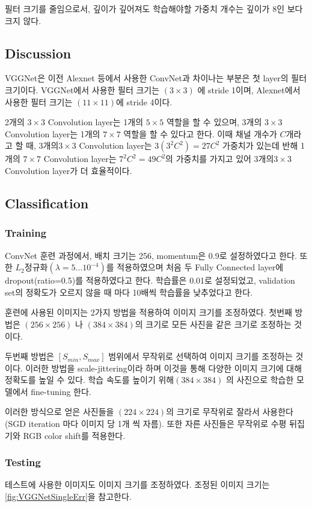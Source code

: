 \documentclass[extendedabs]{bmvc2k}
\begin{document}
필터 크기를 줄임으로서, 깊이가 깊어져도 학습해야할 가중치 개수는 깊이가 8인 \cite{overfeat}보다 크지 않다.
\subsection{Discussion}
VGGNet은 이전 Alexnet\cite{AlexNet} 등에서 사용한 ConvNet과 차이나는 부분은 첫 layer의 필터 크기이다. VGGNet에서 사용한 필터 크기는 $(3\times 3)$ 에 stride 1이며, Alexnet\cite{AlexNet}에서 사용한 필터 크기는 $(11\times 11)$에 stride 4이다.

2개의 $3 \times 3$ Convolution layer는 1개의 $5\times 5$ 역할을 할 수 있으며, 3개의 $3 \times 3$ Convolution layer는 1개의 $7\times 7$ 역할을 할 수 있다고 한다. 이때 채널 개수가 $C$개라고 할 때, 3개의$ 3\times 3$ Convolution layer는 $3(3^2C^2)=27C^2$ 가중치가 있는데 반해 1개의 $7\times 7$ Convolution layer는 $7^2C^2=49C^2$의 가중치를 가지고 있어 3개의$ 3\times 3$ Convolution layer가 더 효율적이다.

\subsection{Classification}
\subsubsection{Training}
ConvNet 훈련 과정에서, 배치 크기는 256, momentum은 0.9로 설정하였다고 한다. 또한 $L_2$정규화$(\lambda = 5\dots10^{-4})$를 적용하였으며 처음 두 Fully Connected layer에 dropout(ratio=0.5)를 적용하였다고 한다. 학습률은 0.01로 설정되었고, validation set의 정확도가 오르지 않을 때 마다 10배씩 학습률을 낮추었다고 한다.

훈련에 사용된 이미지는 2가지 방법을 적용하여 이미지 크기를 조정하였다. 첫번째 방법은 $(256\times256)$ 나 $(384\times384)$의 크기로 모든 사진을 같은 크기로 조정하는 것이다.

두번째 방법은 $[S_{min},S_{max}]$ 범위에서 무작위로 선택하여 이미지 크기를 조정하는 것이다. 이러한 방법을 scale-jittering이라 하며 이것을 통해 다양한 이미지 크기에 대해 정확도를 높일 수 있다. 학습 속도를 높이기 위해$(384\times384)$ 의 사진으로 학습한 모델에서 fine-tuning 한다.

이러한 방식으로 얻은 사진들을 $(224\times224)$의 크기로 무작위로 잘라서 사용한다(SGD iteration 마다 이미지 당 1개 씩 자름). 또한 자른 사진들은 무작위로 수평 뒤집기와 RGB color shift를 적용한다.

\subsubsection{Testing}
테스트에 사용한 이미지도 이미지 크기를 조정하였다. 조정된 이미지 크기는 \ref{fig:VGGNetSingleErr}을 참고한다.
\end{document}
